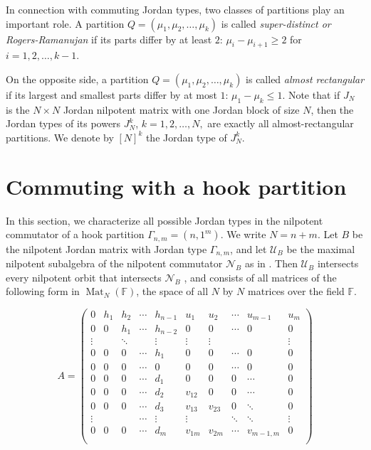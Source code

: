 \documentclass[11pt]{amsproc}
\newcommand{\U}{\mathcal{U}}
\newcommand{\Nil}{\mathcal{N}}
\begin{document}
In connection with commuting Jordan types, two classes of partitions play an important role. A partition $Q=(\mu_1,\mu_2,\ldots,\mu_k)$ is called \emph{super-distinct or Rogers-Ramanujan} if its parts differ by at least $2$: $\mu_i-\mu_{i+1}\ge 2$ for $i=1,2,\ldots,k-1$.

On the opposite side, a partition $Q=(\mu_1,\mu_2,\ldots,\mu_k)$ is called \emph{almost rectangular}  if its largest and smallest parts differ by at most $1$: $\mu_1-\mu_{k}\le 1$. Note that if $J_N$ is the $N\times N$ Jordan nilpotent matrix with one Jordan block of size $N$, then the Jordan types of its powers $J_N^k$, $k=1,2,\ldots,N,$ are exactly all almost-rectangular partitions. We denote by $[N]^k$ the Jordan type of $J_N^k$.


\section{Commuting with a hook partition}\label{hook}



In this section, we characterize all possible Jordan types in the nilpotent commutator of a hook partition $\Gamma_{n,m}=(n,1^m)$. We write $N=n+m$. Let $B$ be the nilpotent Jordan matrix with Jordan type $\Gamma_{n,m}$, and let $\U_{B}$ be the maximal nilpotent subalgebra of the nilpotent commutator $\Nil_B$ as in \cite{BaIK2010}. Then $\U_B$ intersects every nilpotent orbit that intersects $\Nil_B$ \cite[Lem. 2.2]{BaIK2010}, and consists of all matrices of the following form in $\operatorname{Mat}_{N}(\mathbb{F})$, the space of all $N$ by  $N$ matrices over the field $\mathbb{F}$.

\begin{equation}\label{generic in U}
A=\left(\begin{array}{ccccc|ccccc}
    0 & h_1 & h_2 & \cdots & h_{n-1} & u_1 & u_2 & \cdots & u_{m-1} & u_{m}\\
    0 & 0   & h_1 & \cdots & h_{n-2} & 0   & 0   & \cdots & 0        & 0\\
    \vdots &     & \ddots &        & \vdots & \vdots & \vdots &        &        & \vdots\\
    0 & 0   & 0   & \cdots & h_1     & 0   & 0   & \cdots & 0        & 0\\ 
     0 & 0   & 0   & \cdots & 0     & 0   & 0   & \cdots & 0        & 0\\
    \hline
    0 & 0   & 0   & \cdots & d_1     & 0   & 0   & 0 & \cdots       & 0\\
    0 & 0   & 0   & \cdots & d_2     & v_{12}   &0 & 0& \cdots      &0\\
    0 & 0   & 0   & \cdots & d_3     & v_{13}& v_{23}& 0 & \ddots  & 0\\
    \vdots &     &        & \cdots & \vdots & \vdots &       & \ddots & \ddots & \vdots\\
    0 & 0   & 0   & \cdots & d_m     & v_{1m} & v_{2m} & \cdots & v_{m-1,m} & 0\\
\end{array}
\right)
\end{equation}
\end{document}
